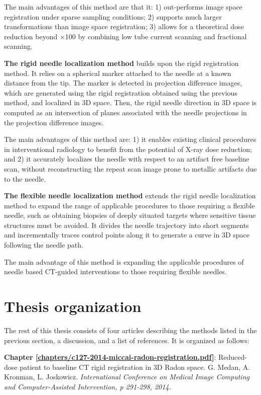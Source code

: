 The main advantages of this method are that it: 
1) out-performs image space registration under sparse sampling conditions;
2) supports much larger transformations than image space registration; 
3) allows for a theoretical dose reduction beyond $\times$100 by combining low tube current scanning and fractional scanning.

\textbf{The rigid needle localization method} builds upon the rigid registration method.
It relies on a spherical marker attached to the needle at a known distance from the tip. The marker is detected in projection difference images, which are generated using the rigid registration obtained using the previous method, and localized in 3D space. Then, the rigid needle direction in 3D space is computed as an intersection of planes associated with the needle projections in the projection difference images.

The main advantages of this method are: 1) it enables existing clinical procedures in interventional radiology to benefit from the potential of X-ray dose reduction; and 2) it accurately localizes the needle with respect to an artifact free baseline scan, without reconstructing the repeat scan image prone to metallic artifacts due to the needle.

\textbf{The flexible needle localization method} extends the rigid needle localization method to expand the range of applicable procedures to those requiring a flexible needle, such as obtaining biopsies of deeply situated targets where sensitive tissue structures must be avoided.
It divides the needle trajectory into short segments and incrementally traces control points along it to generate a curve in 3D space following the needle path.

The main advantage of this method is expanding the applicable procedures of needle based CT-guided interventions to those requiring flexible needles.


\section{Thesis organization}

The rest of this thesis consists of four articles describing the methods listed in the previous section, a discussion, and a list of references. It is organized as follows: 

\textbf{Chapter \ref{chapters/c127-2014-miccai-radon-registration.pdf}}: Reduced-dose patient to baseline CT rigid registration in 3D Radon space.
G. Medan, A. Kronman, L. Joskowicz. \textit{International Conference on Medical Image Computing and Computer-Assisted Intervention, p 291-298, 2014.}

